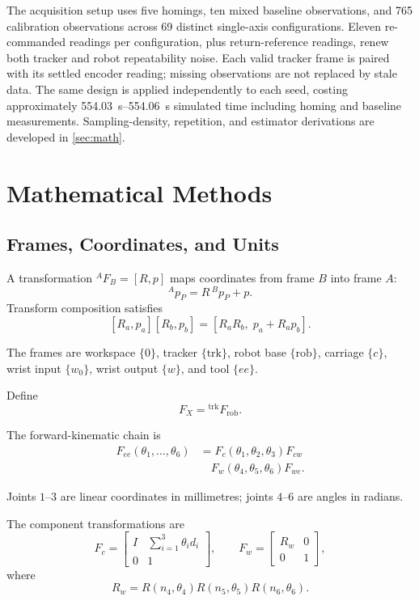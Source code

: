 \documentclass[11pt,letterpaper]{article}
\begin{document}
The acquisition setup uses five homings, ten mixed baseline observations, and 765 calibration observations across 69 distinct single-axis configurations. Eleven re-commanded readings per configuration, plus return-reference readings, renew both tracker and robot repeatability noise. Each valid tracker frame is paired with its settled encoder reading; missing observations are not replaced by stale data. The same design is applied independently to each seed, costing approximately \SIrange{554.03}{554.06}{\second} simulated time including homing and baseline measurements. Sampling-density, repetition, and estimator derivations are developed in \cref{sec:math}.


\section{Mathematical Methods}\label{sec:math
}
\subsection{Frames, Coordinates, and Units}

A transformation ${}^{A}F_B=[R,p]$ maps coordinates
from frame $B$ into frame $A$:
\[
{}^{A}p_P=R\,{}^{B}p_P+p.
\]
Transform composition satisfies
\[
[R_a,p_a][R_b,p_b]
=
[R_aR_b,\;p_a+R_ap_b].
\]

The frames are workspace $\{0\}$, tracker
$\{\mathrm{trk}\}$, robot base $\{\mathrm{rob}\}$,
carriage $\{c\}$, wrist input $\{w_0\}$,
wrist output $\{w\}$, and tool $\{ee\}$.

Define
\[
F_X={}^{\mathrm{trk}}F_{\mathrm{rob}}.
\]

The forward-kinematic chain is
\[
\begin{aligned}
F_{ee}(\theta_1,\ldots,\theta_6)
&=
F_c(\theta_1,\theta_2,\theta_3)F_{cw}\\
&\quad{} F_w(\theta_4,\theta_5,\theta_6)F_{we}.
\end{aligned}
\]

Joints $1$--$3$ are linear coordinates in millimetres;
joints $4$--$6$ are angles in radians.

The component transformations are
\[
F_c=
\begin{bmatrix}
I&\displaystyle\sum_{i=1}^{3}\theta_i d_i\\
0&1
\end{bmatrix},
\qquad
F_w=
\begin{bmatrix}
R_w&0\\
0&1
\end{bmatrix},
\]
where
\[
R_w=
R(n_4,\theta_4)
R(n_5,\theta_5)
R(n_6,\theta_6).
\]
\end{document}
